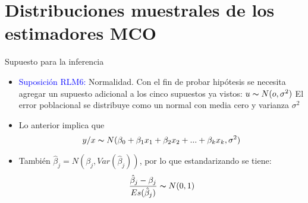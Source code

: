 \section{Distribuciones muestrales de los estimadores MCO}
\begin{frame}{Supuesto para la inferencia}
	\begin{itemize}
		\item \textcolor{blue}{Suposición RLM6:} Normalidad. Con el fin de probar hipótesis se necesita agregar un supuesto adicional a los cinco supuestos ya vistos: $u \thicksim N(o,\sigma^2)$ El error poblacional se distribuye como un  normal con media cero y varianza $\sigma^2$ \pause
		\item Lo anterior implica que \pause
			$$y/x \thicksim N(\beta_{0}+\beta_{1}x_{1}+\beta_{2}x_{2}+...+\beta_{k}x_{k},\sigma^2)$$ \pause
		\item También $\hat{\beta}_{j}=N(\beta_{j},Var(\hat{\beta}_{j}))$, por lo que estandarizando se tiene: \pause
			$$\frac{\hat{\beta}_{j}-\beta_{j}}{Es(\hat{\beta}_{j})} \thicksim N(0,1)$$
	\end{itemize}
\end{frame}